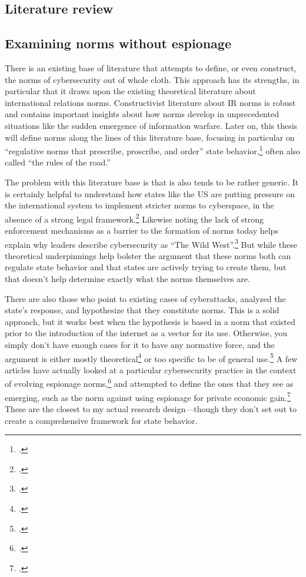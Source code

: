 \documentclass{report}
\begin{document}
\begin{refsegment}
\section{Literature review}
\subsection{Examining norms without espionage}
There is an existing base of literature that attempts to define, or even construct, the norms of cybersecurity out of whole cloth. This approach has its strengths, in particular that it draws upon the existing theoretical literature about international relations norms. Constructivist literature about IR norms is robust and contains important insights about how norms develop in unprecedented situations like the sudden emergence of information warfare. Later on, this thesis will define norms along the lines of this literature base, focusing in particular on ``regulative norms that prescribe, proscribe, and order'' state behavior,\footcite{bjorkdahl_norms_2002} often also called ``the rules of the road.''

The problem with this literature base is that is also tends to be rather generic. It is certainly helpful to understand how states like the US are putting pressure on the international system to implement stricter norms to cyberspace, in the absence of a strong legal framework.\footcite[~p.7]{finnemore_constructing_2016} Likewise noting the lack of strong enforcement mechanisms as a barrier to the formation of norms today helps explain why leaders describe cybersecurity as ``The Wild West''.\footcite{iasiello_what_2016} But while these theoretical underpinnings help bolster the argument that these norms both can regulate state behavior and that states are actively trying to create them, but that doesn't help determine exactly what the norms themselves are.

There are also those who point to existing cases of cyberattacks, analyzed the state's response, and hypothesize that they constitute norms. This is a solid approach, but it works best when the hypothesis is based in a norm that existed prior to the introduction of the internet as a vector for its use. Otherwise, you simply don't have enough cases for it to have any normative force, and the argument is either mostly theoretical\footcite{neutze_cyber_2013} or too specific to be of general use.\footcite{caso_rules_2014} A few articles have actually looked at a particular cybersecurity practice in the context of evolving espionage norms,\footcite{libicki_coming_2017} and attempted to define the ones that they see as emerging, such as the norm against using espionage for private economic gain.\footcite{rascoff_norm_2016} These are the closest to my actual research design---though they don't set out to create a comprehensive framework for state behavior.


\end{refsegment}
\end{document}
